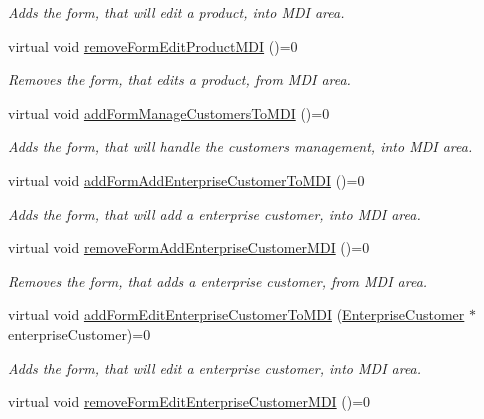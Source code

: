 \begin{DoxyCompactItemize}
\begin{DoxyCompactList}\small\item\em \-Adds the form, that will edit a product, into \-M\-D\-I area. \end{DoxyCompactList}\item 
virtual void \hyperlink{class_i_main_window_a3f7f2093285cdbdeed8ad1930ed6ddee}{remove\-Form\-Edit\-Product\-M\-D\-I} ()=0
\begin{DoxyCompactList}\small\item\em \-Removes the form, that edits a product, from \-M\-D\-I area. \end{DoxyCompactList}\item 
virtual void \hyperlink{class_i_main_window_a0d84578ab1b61b47dfb56c455b3d0ada}{add\-Form\-Manage\-Customers\-To\-M\-D\-I} ()=0
\begin{DoxyCompactList}\small\item\em \-Adds the form, that will handle the customers management, into \-M\-D\-I area. \end{DoxyCompactList}\item 
virtual void \hyperlink{class_i_main_window_a09cc2c103d3b2474fd41c7140e9bf5a6}{add\-Form\-Add\-Enterprise\-Customer\-To\-M\-D\-I} ()=0
\begin{DoxyCompactList}\small\item\em \-Adds the form, that will add a enterprise customer, into \-M\-D\-I area. \end{DoxyCompactList}\item 
virtual void \hyperlink{class_i_main_window_a4f019f8d5965c955f069261d35450ba1}{remove\-Form\-Add\-Enterprise\-Customer\-M\-D\-I} ()=0
\begin{DoxyCompactList}\small\item\em \-Removes the form, that adds a enterprise customer, from \-M\-D\-I area. \end{DoxyCompactList}\item 
virtual void \hyperlink{class_i_main_window_ac0a88b5faa800f8371ae914f726b90bd}{add\-Form\-Edit\-Enterprise\-Customer\-To\-M\-D\-I} (\hyperlink{class_enterprise_customer}{\-Enterprise\-Customer} $\ast$enterprise\-Customer)=0
\begin{DoxyCompactList}\small\item\em \-Adds the form, that will edit a enterprise customer, into \-M\-D\-I area. \end{DoxyCompactList}\item 
virtual void \hyperlink{class_i_main_window_a4e822fbb08b1c4afb3b22d533c00e63e}{remove\-Form\-Edit\-Enterprise\-Customer\-M\-D\-I} ()=0

\end{DoxyCompactItemize}
